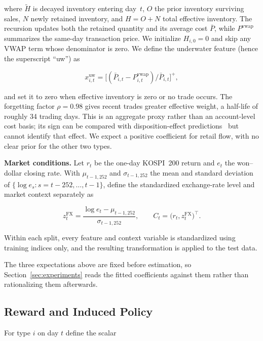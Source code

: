 \documentclass[sigconf,anonymous,review]{acmart}
\begin{document}
where $\tilde H$ is decayed inventory entering day~$t$, $O$ the prior
inventory surviving sales, $N$ newly retained inventory, and
$H = O + N$ total effective inventory. The recursion updates both the
retained quantity and its average cost $\bar P$, while
$P^{\mathrm{vwap}}$ summarizes the same-day transaction price. We
initialize $H_{i,0} = 0$ and skip any VWAP term whose denominator is
zero. We define the underwater feature (hence the superscript ``uw'') as

\begin{equation}
  \label{eq:lossregion}
  x^{\mathrm{uw}}_{i,t} = \bigl[(\bar P_{i,t} - P^{\mathrm{vwap}}_{i,t})
    / \bar P_{i,t}\bigr]^{+},
\end{equation}

and set it to zero when effective inventory is zero or no trade occurs.
The forgetting factor $\rho = 0.98$ gives recent trades greater effective
weight, a half-life of roughly 34 trading days. This is an aggregate
proxy rather than an account-level cost basis; its sign can be compared
with disposition-effect predictions~\cite{shefrin_statman,odean1998} but
cannot identify that effect. We expect a positive coefficient for retail
flow, with no clear prior for the other two types.

\textbf{Market conditions.} Let $r_t$ be the one-day KOSPI~200 return and
$e_t$ the won--dollar closing rate. With $\mu_{t-1,252}$ and
$\sigma_{t-1,252}$ the mean and standard deviation of
$\{\log e_s : s = t-252, \dots, t-1\}$, define the standardized exchange-rate
level and market context separately as

\[
  z^{\mathrm{FX}}_t
    = \frac{\log e_t - \mu_{t-1,252}}{\sigma_{t-1,252}},
  \qquad
  C_t = \bigl(r_t, z^{\mathrm{FX}}_t\bigr)^{\top}.
\]

Within each split, every feature
and context variable is standardized using training indices only, and the
resulting transformation is applied to the test data.

The three expectations above are fixed before estimation, so
Section~\ref{sec:experiments} reads the fitted coefficients against them
rather than rationalizing them afterwards.

\subsection{Reward and Induced Policy}
\label{sec:method-reward}

For type $i$ on day $t$ define the scalar
\end{document}
